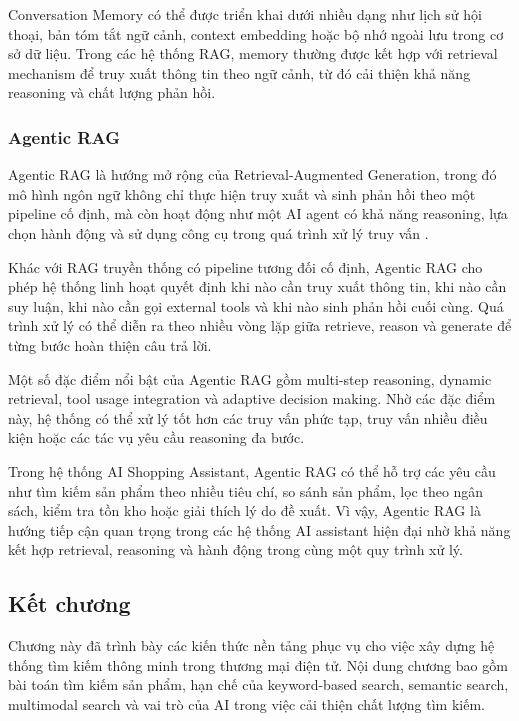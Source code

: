 Conversation Memory có thể được triển khai dưới nhiều dạng như lịch sử hội thoại, bản tóm tắt ngữ cảnh, context embedding hoặc bộ nhớ ngoài lưu trong cơ sở dữ liệu. Trong các hệ thống RAG, memory thường được kết hợp với retrieval mechanism để truy xuất thông tin theo ngữ cảnh, từ đó cải thiện khả năng reasoning và chất lượng phản hồi.

\subsubsection{Agentic RAG}

Agentic RAG là hướng mở rộng của Retrieval-Augmented Generation, trong đó mô hình ngôn ngữ không chỉ thực hiện truy xuất và sinh phản hồi theo một pipeline cố định, mà còn hoạt động như một AI agent có khả năng reasoning, lựa chọn hành động và sử dụng công cụ trong quá trình xử lý truy vấn \parencite{yao2023react}.

Khác với RAG truyền thống có pipeline tương đối cố định, Agentic RAG cho phép hệ thống linh hoạt quyết định khi nào cần truy xuất thông tin, khi nào cần suy luận, khi nào cần gọi external tools và khi nào sinh phản hồi cuối cùng. Quá trình xử lý có thể diễn ra theo nhiều vòng lặp giữa retrieve, reason và generate để từng bước hoàn thiện câu trả lời.

Một số đặc điểm nổi bật của Agentic RAG gồm multi-step reasoning, dynamic retrieval, tool usage integration và adaptive decision making. Nhờ các đặc điểm này, hệ thống có thể xử lý tốt hơn các truy vấn phức tạp, truy vấn nhiều điều kiện hoặc các tác vụ yêu cầu reasoning đa bước.

Trong hệ thống AI Shopping Assistant, Agentic RAG có thể hỗ trợ các yêu cầu như tìm kiếm sản phẩm theo nhiều tiêu chí, so sánh sản phẩm, lọc theo ngân sách, kiểm tra tồn kho hoặc giải thích lý do đề xuất. Vì vậy, Agentic RAG là hướng tiếp cận quan trọng trong các hệ thống AI assistant hiện đại nhờ khả năng kết hợp retrieval, reasoning và hành động trong cùng một quy trình xử lý.
\subsection*{Kết chương}

Chương này đã trình bày các kiến thức nền tảng phục vụ cho việc xây dựng hệ thống tìm kiếm thông minh trong thương mại điện tử. Nội dung chương bao gồm bài toán tìm kiếm sản phẩm, hạn chế của keyword-based search, semantic search, multimodal search và vai trò của AI trong việc cải thiện chất lượng tìm kiếm.

